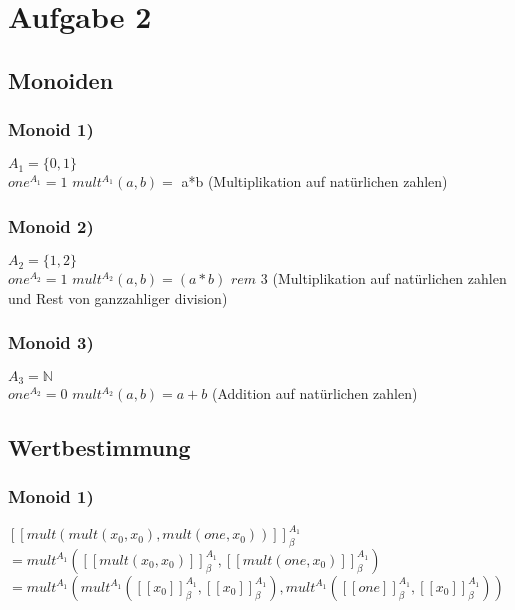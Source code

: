 \section*{Aufgabe 2}

\subsection*{Monoiden}
\subsubsection*{Monoid 1)}

$A_1 = \{ 0 , 1 \}$\\
$one^{A_1} = 1$ $mult^{A_1}(a,b)= $ a*b (Multiplikation auf natürlichen zahlen)\\

\subsubsection*{Monoid 2)}

$A_2 = \{ 1 , 2 \}$\\
$one^{A_2} = 1$ $mult^{A_2}(a,b)= (a*b)$ $ rem $ $3 $ (Multiplikation auf natürlichen zahlen und Rest von ganzzahliger division)\\

\subsubsection*{Monoid 3)}

$A_3 = \mathbb{N}$\\
$one^{A_2} = 0$ $mult^{A_2}(a,b)= a+b $ (Addition auf natürlichen zahlen)\\

\subsection*{Wertbestimmung}
\subsubsection*{Monoid 1)}

$[[mult(mult(x_0 ,x_0), mult(one,x_0 )) ]]^{A_1}_{\beta}$\\

$= mult^{A_1}([[mult(x_0 ,x_0)]]^{A_1}_{\beta}, [[mult(one,x_0 ) ]]^{A_1}_{\beta})$\\

$= mult^{A_1}(
mult^{A_1}(
[[x_0 ]]^{A_1}_{\beta} , [[x_0 ]]^{A_1}_{\beta}
), mult^{A_1}( 
[[one]]^{A_1}_{\beta} , [[x_0]]^{A_1}_{\beta} )) $\\

